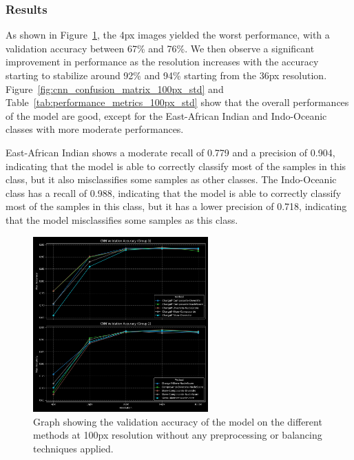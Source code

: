 \subsubsection{Results}
\label{subsubsec:results_initial_testing}

As shown in Figure~\ref{fig:cnn_validation_accuracy_std}, the 4px images yielded the worst performance, with a validation accuracy between 67\%
and 76\%. We then observe a significant improvement in performance as the resolution increases with the accuracy starting to stabilize
around 92\% and 94\% starting from the 36px resolution. Figure~\ref{fig:cnn_confusion_matrix_100px_std} and Table~\ref{tab:performance_metrics_100px_std}
show that the overall performances of the model are good, except for the East-African Indian and Indo-Oceanic classes with more moderate performances.

East-African Indian shows a moderate recall of 0.779 and a precision of 0.904, indicating that the model is able to correctly classify
most of the samples in this class, but it also misclassifies some samples as other classes. The Indo-Oceanic class has a recall of 0.988,
indicating that the model is able to correctly classify most of the samples in this class, but it has a lower precision of 0.718, indicating
that the model misclassifies some samples as this class.

\begin{figure}[H]
	\centering
	\includegraphics[width=0.6\textwidth]{../imgs/graphs/standard/cnn_validation_accuracy_groups_mask_5_std.png}
	\caption{Graph showing the validation accuracy of the model on the different methods at 100px resolution without any preprocessing or
		balancing techniques applied.}
	\label{fig:cnn_validation_accuracy_std}
\end{figure}

